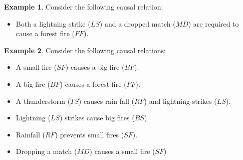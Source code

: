 \documentclass[11pt,a4paper]{book}
\theoremstyle{definition}
\theoremstyle{definition}
\newtheorem{example}{Example}[section]
\theoremstyle{definition}
\theoremstyle{remark}
\begin{document}
\begin{example}
\label{ex:causal_model_forrest_fire_2}
Consider the following causal relation:
\begin{itemize}
\item Both a lightning strike ($\mathit{LS}$) and a dropped match ($\mathit{MD}$) are required to cause a forest fire ($\mathit{FF}$).
\end{itemize}
\end{example}

\begin{example}
\label{ex:causal_model_forrest_fire_3}
Consider the following causal relations:
\begin{itemize}
\item A small fire ($\mathit{SF}$) causes a big fire ($\mathit{BF}$).
\item A big fire ($\mathit{BF}$) causes a forest fire ($\mathit{FF}$).
\item A thunderstorm ($\mathit{TS}$) causes rain fall ($\mathit{RF}$) and lightning strikes ($\mathit{LS}$).
\item Lightning  ($\mathit{LS}$) strikes cause big fires  ($\mathit{BS}$)
\item Rainfall ($\mathit{RF}$) prevents small fires ($\mathit{SF}$).  
\item Dropping a match ($\mathit{MD}$) causes a small fire ($\mathit{SF}$)
\end{itemize}
\end{example}
\end{document}

